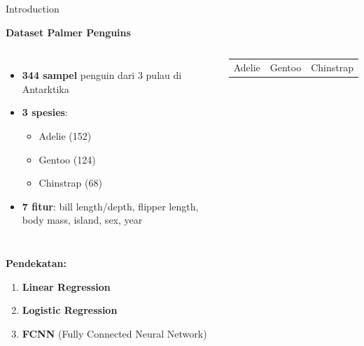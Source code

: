 \documentclass[aspectratio=169]{beamer}
\newcommand{\hlb}[1]{\textcolor{AWSBlue}{\textbf{#1}}}
\newcommand{\hlg}[1]{\textcolor{AWSGreen}{\textbf{#1}}}
\begin{document}
\begin{frame}{Introduction}
\fontsize{11}{12}\selectfont

\textbf{Dataset Palmer Penguins}

\vspace{0.2in}
\begin{columns}
\begin{itemize}
    \item \hlg{344 sampel} penguin dari 3 pulau di Antarktika
    \item \hlg{3 spesies}: 
    \begin{itemize}
        \item Adelie (152)
        \item Gentoo (124)  
        \item Chinstrap (68)
    \end{itemize}
    \item \hlb{7 fitur}: bill length/depth, flipper length, body mass, island, sex, year
\end{itemize}

\begin{center}
\begin{tabular}{ccc}
\rowcolor{AWSGreen!30}
Adelie & Gentoo & Chinstrap \\
\end{tabular}
\end{center}
\end{columns}

\vspace{0.3in}
\textbf{Pendekatan:}

\begin{enumerate}
    \item \textbf{Linear Regression} 
    \item \textbf{Logistic Regression}
    \item \textbf{FCNN} (Fully Connected Neural Network)
\end{enumerate}
\end{frame}
\end{document}
